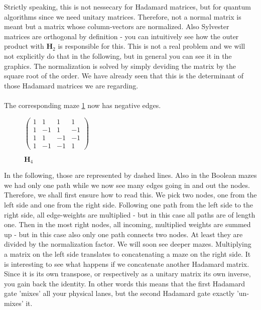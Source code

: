 \documentclass[oneside]{thesisclass}
\begin{document}
Strictly speaking, this is not nessecary for Hadamard matrices, but for quantum algorithms since we need unitary matrices.
Therefore, not a normal matrix is meant but a matrix whose column-vectors are normalized.
Also Sylvester matrices are orthogonal by definition - you can intuitively see how the outer product with $\mathbf H_2$ is responsible for this.
This is not a real problem and we will not explicitly do that in the following, but in general you can see it in the graphics.
The normalization is solved by simply deviding the matrix by the square root of the order.
We have already seen that this is the determinant of those Hadamard matrices we are regarding.\\
\\The corresponding maze \ref{h4}
now has negative edges.
\begin{figure}
 \begin{center}
  $
 \begin{pmatrix}
  1 & 1 & 1 & 1 \\
  1 & -1 & 1 & -1 \\
  1 & 1 & -1 & -1 \\
  1 & -1 & -1 & 1
  \end{pmatrix}
 $
  \caption{$\mathbf H_4$}
  \label{h4}
 \end{center}
\end{figure}
In the following, those are represented by dashed lines.
Also in the Boolean mazes we had only one path while we now see many edges going in and out the nodes.
Therefore, we shall first ensure how to read this.
We pick two nodes, one from the left side and one from the right side.
Following one path from the left side to the right side, all edge-weights are multiplied - but in this case all paths are of length one.
Then in the most right nodes, all incoming, multiplied weights are summed up - but in this case also only one path connects two nodes.
At least they are divided by the normalization factor.
We will soon see deeper mazes.
Multiplying a matrix on the left side translates to concatenating a maze on the right side.
It is interesting to see what happens if we concatenate another Hadamard matrix.
Since it is its own transpose, or respectively as a unitary matrix its own inverse, you gain back the identity.
In other words this means that the first Hadamard gate 'mixes' all your physical lanes, but the second Hadamard gate exactly 'un-mixes' it.\\
\end{document}
